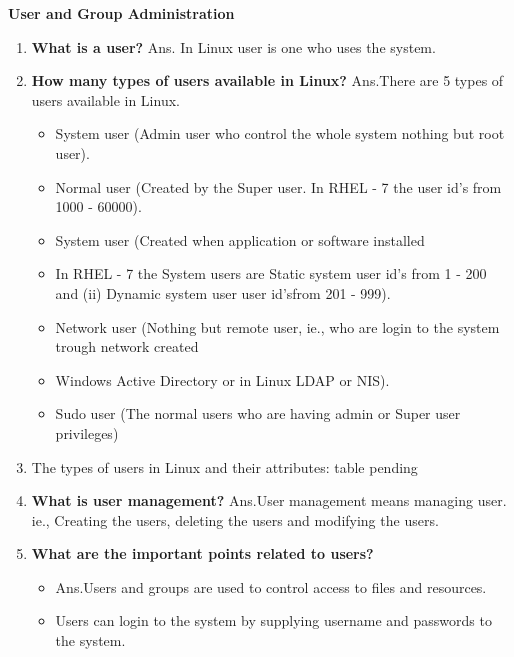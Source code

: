 \item \textbf{User and Group Administration}
\begin{enumerate}
    \item \textbf {What is a user?}\newline
    Ans. In Linux user is one who uses the system. 
\bigskip
\bigskip
    \item \textbf {How many types of users available in Linux?}\newline
    Ans.There are 5 types of users available in Linux.
     \begin{itemize}
    \item System user   (Admin user who control the whole system nothing but root user).
    \item Normal user  (Created by the Super user. In RHEL - 7 the user id's from 1000 - 60000).
    \item System user   (Created when application or software installed 
    \item In RHEL - 7 the System users are\newline
    Static system user id's from 1 - 200 and \newline
    (ii) Dynamic system user user id'sfrom 201 - 999).\newline
    \item Network user   (Nothing but remote user, ie., who are login to the system trough network  created
    \item Windows Active Directory or in Linux LDAP or NIS). 
    \item Sudo user   (The normal users who are having admin or Super user privileges)
    \end{itemize}
    \item The types of users in Linux and their attributes:\newline
    table pending
    \item \textbf { What is user management?}\newline
    Ans.User management means managing user. ie., Creating the users, deleting the users and modifying the users.
    \bigskip
    \bigskip
    \item \textbf{What are the important points related to users?}
    \begin {itemize}
    \item Ans.Users and groups are used to control access to files and resources.\newline
    \item Users can login to the system by supplying username and passwords to the system.\newline

\end{itemize}
\end{enumerate}
